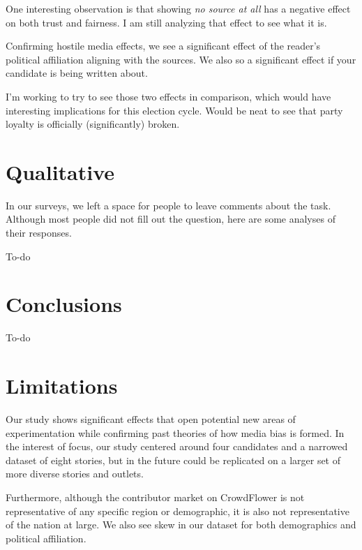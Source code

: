 One interesting observation is that showing \emph{no source at all} has a negative effect on both trust and fairness. I am still analyzing that effect to see what it is.
 
Confirming hostile media effects, we see a significant effect of the reader's political affiliation aligning with the sources. We also so a significant effect if your candidate is being written about. 

I'm working to try to see those two effects in comparison, which would have interesting implications for this election cycle. Would be neat to see that party loyalty is officially (significantly) broken.

\section{Qualitative}
In our surveys, we left a space for people to leave comments about the task. Although most people did not fill out the question, here are some analyses of their responses.

To-do

\section{Conclusions}

To-do

\section{Limitations}

Our study shows significant effects that open potential new areas of experimentation while confirming past theories of how media bias is formed. In the interest of focus, our study centered around four candidates and a narrowed dataset of eight stories, but in the future could be replicated on a larger set of more diverse stories and outlets. 

Furthermore, although the contributor market on CrowdFlower is not representative of any specific region or demographic, it is also not representative of the nation at large. We also see skew in our dataset for both demographics and political affiliation.


